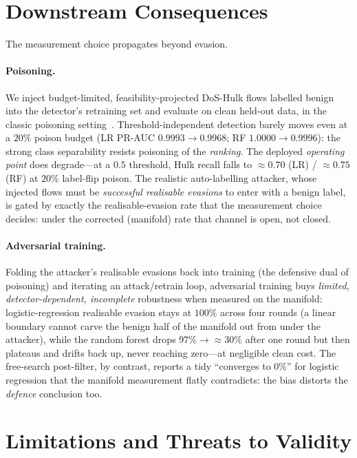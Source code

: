 \documentclass[10pt,twocolumn]{article}
\begin{document}
\section{Downstream Consequences}
\label{sec:downstream}

The measurement choice propagates beyond evasion.

\paragraph{Poisoning.}
We inject budget-limited, feasibility-projected DoS-Hulk flows labelled benign
into the detector's retraining set and evaluate on clean held-out data, in the
classic poisoning setting~\cite{biggio2012poisoning}. Threshold-independent
detection barely moves even at a $20\%$ poison budget (LR PR-AUC
$0.9993\!\to\!0.9968$; RF $1.0000\!\to\!0.9996$): the strong class separability
resists poisoning of the \emph{ranking}. The deployed \emph{operating point} does
degrade---at a $0.5$ threshold, Hulk recall falls to $\approx0.70$ (LR) /
$\approx0.75$ (RF) at $20\%$ label-flip poison. The realistic auto-labelling
attacker, whose injected flows must be \emph{successful realisable evasions} to
enter with a benign label, is gated by exactly the realisable-evasion rate that
the measurement choice decides: under the corrected (manifold) rate that channel
is open, not closed.

\paragraph{Adversarial training.}
Folding the attacker's realisable evasions back into training (the defensive dual
of poisoning) and iterating an attack/retrain loop, adversarial training buys
\emph{limited, detector-dependent, incomplete} robustness when measured on the
manifold: logistic-regression realisable evasion stays at $100\%$ across four
rounds (a linear boundary cannot carve the benign half of the manifold out from
under the attacker), while the random forest drops $97\%\!\to\!\approx30\%$ after
one round but then plateaus and drifts back up, never reaching zero---at
negligible clean cost. The free-search post-filter, by contrast, reports a tidy
``converges to $0\%$'' for logistic regression that the manifold measurement flatly
contradicts: the bias distorts the \emph{defence} conclusion too.

\section{Limitations and Threats to Validity}
\label{sec:limitations}
\end{document}
